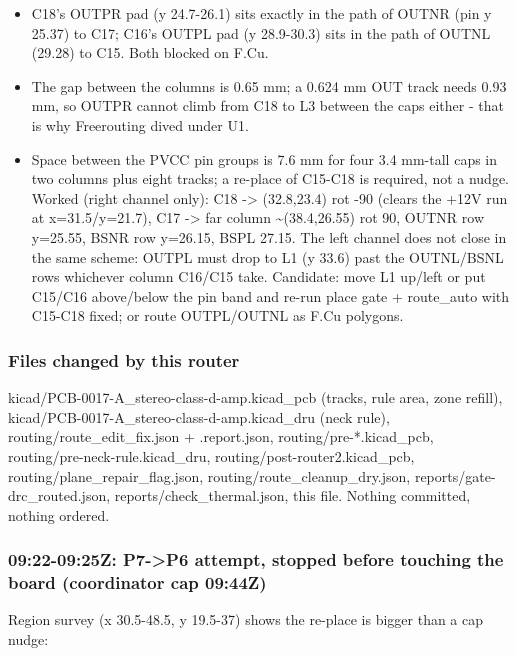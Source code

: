 \documentclass[11pt]{article}
\begin{document}
\begin{itemize}
\item C18's OUTPR pad (y 24.7-26.1) sits exactly in the path of OUTNR (pin y 25.37) to C17; C16's
OUTPL pad (y 28.9-30.3) sits in the path of OUTNL (29.28) to C15. Both blocked on F.Cu.
\item The gap between the columns is 0.65 mm; a 0.624 mm OUT track needs 0.93 mm, so OUTPR cannot
climb from C18 to L3 between the caps either - that is why Freerouting dived under U1.
\item Space between the PVCC pin groups is 7.6 mm for four 3.4 mm-tall caps in two columns plus
eight tracks; a re-place of C15-C18 is required, not a nudge. Worked (right channel only):
C18 -\textgreater{} (32.8,23.4) rot -90 (clears the +12V run at x=31.5/y=21.7), C17 -\textgreater{} far column \textasciitilde{}(38.4,26.55)
rot 90, OUTNR row y=25.55, BSNR row y=26.15, BSPL 27.15. The left channel does not close in the
same scheme: OUTPL must drop to L1 (y 33.6) past the OUTNL/BSNL rows whichever column C16/C15
take. Candidate: move L1 up/left or put C15/C16 above/below the pin band and re-run
place gate + route\_auto with C15-C18 fixed; or route OUTPL/OUTNL as F.Cu polygons.
\end{itemize}
\subsubsection*{Files changed by this router}
kicad/PCB-0017-A\_stereo-class-d-amp.kicad\_pcb (tracks, rule area, zone refill), kicad/PCB-0017-A\_stereo-class-d-amp.kicad\_dru (neck rule), routing/route\_edit\_fix.json + .report.json, routing/pre-{*}.kicad\_pcb, routing/pre-neck-rule.kicad\_dru, routing/post-router2.kicad\_pcb, routing/plane\_repair\_flag.json, routing/route\_cleanup\_dry.json, reports/gate-drc\_routed.json, reports/check\_thermal.json, this file. Nothing committed, nothing ordered.

\subsubsection*{09:22-09:25Z: P7-\textgreater{}P6 attempt, stopped before touching the board (coordinator cap 09:44Z)}
Region survey (x 30.5-48.5, y 19.5-37) shows the re-place is bigger than a cap nudge:
\end{document}

